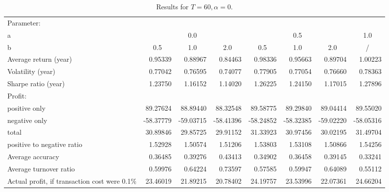 \begin{table}[b]
  \centering
  \caption{Results for $T = 60, \alpha=0$.}
  \label{table:results-1}
  \begin{tabularx}{\textwidth}{@{}lrrrrrrr@{}}
    \toprule
    Parameter: & & & & & & & \\
    \quad a & \multicolumn{3}{c}{0.0} & \multicolumn{3}{c}{0.5} & \multicolumn{1}{c}{1.0} \\ \cmidrule(lr){2-4} \cmidrule(lr){5-7} \cmidrule(lr){8-8}
    \quad b & \multicolumn{1}{c}{0.5} & \multicolumn{1}{c}{1.0} & \multicolumn{1}{c}{2.0} & \multicolumn{1}{c}{0.5} & \multicolumn{1}{c}{1.0} & \multicolumn{1}{c}{2.0} & \multicolumn{1}{c}{/} \\ \midrule
    Average return (year) & 0.95339 & 0.88967 & 0.84463 & 0.98336 & 0.95663 & 0.89704 & 1.00223 \\
    Volatility (year) & 0.77042 & 0.76595 & 0.74077 & 0.77905 & 0.77054 & 0.76660 & 0.78363 \\
    Sharpe ratio (year) & 1.23750 & 1.16152 & 1.14020 & 1.26225 & 1.24150 & 1.17015 & 1.27896 \\ \midrule
    Profit: &  &  &  &  &  &  &  \\
    \quad positive only & 89.27624 & 88.89440 & 88.32548 & 89.58775 & 89.29840 & 89.04414 & 89.55020 \\
    \quad negative only & -58.37779 & -59.03715 & -58.41396 & -58.24852 & -58.32385 & -59.02220 & -58.05316 \\
    \quad total & 30.89846 & 29.85725 & 29.91152 & 31.33923 & 30.97456 & 30.02195 & 31.49704 \\
    \quad positive to negative ratio & 1.52928 & 1.50574 & 1.51206 & 1.53803 & 1.53108 & 1.50866 & 1.54256 \\ \midrule
    Average accuracy & 0.36485 & 0.39276 & 0.43413 & 0.34902 & 0.36458 & 0.39145 & 0.33241 \\
    Average turnover ratio & 0.59976 & 0.64224 & 0.73597 & 0.57585 & 0.59947 & 0.64089 & 0.55112 \\ \midrule
    Actual profit, if transaction cost were 0.1\% & 23.46019 & 21.89215 & 20.78402 & 24.19757 & 23.53996 & 22.07361 & 24.66204 \\ \bottomrule
  \end{tabularx}
\end{table}